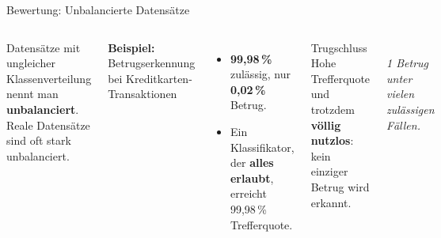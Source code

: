 \begin{frame}{Bewertung: Unbalancierte Datensätze}
\begin{columns}
Datensätze mit ungleicher Klassenverteilung nennt man
\textbf{unbalanciert}. Reale Datensätze sind oft stark unbalanciert.

\vspace{0.4em}
\textbf{Beispiel:} Betrugserkennung bei Kreditkarten-Transaktionen
\begin{itemize}
  \item \textbf{99,98\,\%} zulässig, nur \textbf{0,02\,\%} Betrug.
  \item Ein Klassifikator, der \textbf{alles erlaubt}, erreicht
        99,98\,\% Trefferquote.
\end{itemize}

\vspace{0.4em}
\begin{blockC2}{Trugschluss}
Hohe Trefferquote und trotzdem \textbf{völlig nutzlos}: kein einziger
Betrug wird erkannt.
\end{blockC2}

\centering
{}\\[4pt]
{\footnotesize\itshape 1 Betrug unter vielen zulässigen Fällen.}
\end{columns}
\end{frame}



